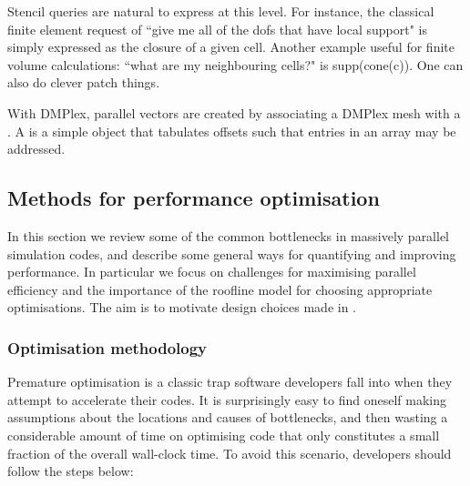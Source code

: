 Stencil queries are natural to express at this level.
For instance, the classical finite element request of ``give me all of the \glspl{dof} that have local support" is simply expressed as the closure of a given cell.
Another example useful for finite volume calculations: ``what are my neighbouring cells?" is supp(cone(c)).
One can also do clever patch things.

With DMPlex, parallel vectors are created by associating a DMPlex mesh with a .
A  is a simple object that tabulates offsets such that entries in an array may be addressed.

\subsection{Methods for performance optimisation}

In this section we review some of the common bottlenecks in massively parallel simulation codes, and describe some general ways for quantifying and improving performance.
In particular we focus on challenges for maximising parallel efficiency and the importance of the roofline model for choosing appropriate optimisations.
The aim is to motivate design choices made in .

\subsubsection{Optimisation methodology}

Premature optimisation is a classic trap software developers fall into when they attempt to accelerate their codes.
It is surprisingly easy to find oneself making assumptions about the locations and causes of bottlenecks, and then wasting a considerable amount of time on optimising code that only constitutes a small fraction of the overall wall-clock time.
To avoid this scenario, developers should follow the steps below:

